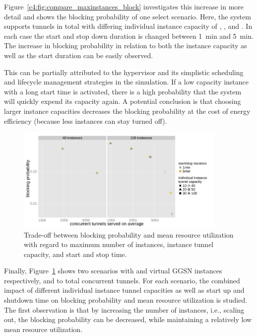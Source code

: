 Figure~\ref{c4:fig:compare_maxinstances_block} investigates this increase in more detail and shows the blocking probability of one select scenario. Here, the system supports  tunnels in total with differing individual instance capacity of , , and . In each case the start and stop down duration is changed between \SI{1}{\minute} and \SI{5}{\minute}. The increase in blocking probability in relation to both the instance capacity as well as the start duration can be easily observed.

This can be partially attributed to the hypervisor and its simplistic scheduling  and lifecycle management strategies in the simulation. If a low capacity instance with a long start time is activated, there is a high probability that the system will quickly expend its capacity again.
A potential conclusion is that choosing larger instance capacities decreases the blocking probability at the cost of energy efficiency (because less instances can stay turned off).

\begin{figure}[htb]
	\centering
	\includegraphics[width=0.9\textwidth]{images/R-virtualized-startstop-tunnelusage-blocking-comparison.pdf}
	\caption{Trade-off between blocking probability and mean resource utilization with regard to maximum number of instances, instance tunnel capacity, and start and stop time.}
\label{c4:fig:compare_util_block}
\end{figure}

Finally, Figure~\ref{c4:fig:compare_util_block} shows two scenarios with  and  virtual \gls{GGSN} instances respectively, and  to  total concurrent tunnels. For each scenario, the combined impact of different individual instance tunnel capacities as well as start up and shutdown time on blocking probability and mean resource utilization is studied. The first observation is that by increasing the number of instances, i.e., scaling out, the blocking probability can be decreased, while maintaining a relatively low mean resource utilization. 

